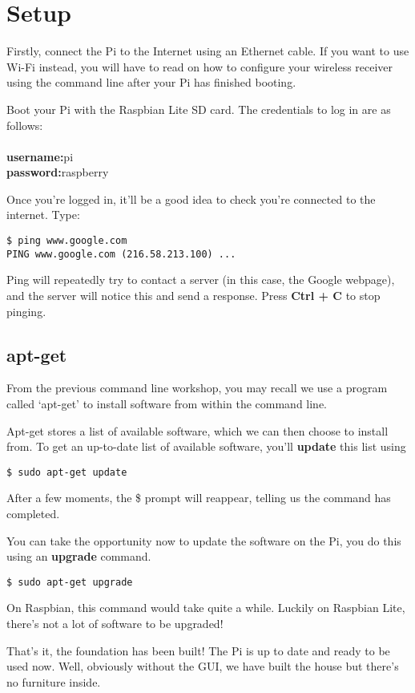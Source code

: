 \section{Setup}

	Firstly, connect the Pi to the Internet using an Ethernet cable. If you want to use Wi-Fi instead, you will have to read on how to configure your wireless receiver using the command line after your Pi has finished booting.
	
	Boot your Pi with the Raspbian Lite SD card. The credentials to log in are as follows:
	\\
	\\\textbf{username:}\hspace{2cm}pi
	\\\textbf{password:}\hspace{2cm}raspberry
	
	\vspace{10pt}
	Once you're logged in, it'll be a good idea to check you're connected to the internet. Type:

\begin{lstlisting}
$ ping www.google.com
PING www.google.com (216.58.213.100) ...
\end{lstlisting}

	Ping will repeatedly try to contact a server (in this case, the Google webpage), and the server will notice this and send a response. Press \textbf{Ctrl + C} to stop pinging.
	
		\subsection*{apt-get}
		
		From the previous command line workshop, you may recall we use a program called `apt-get' to install software from within the command line.
		
		Apt-get stores a list of available software, which we can then choose to install from. To get an up-to-date list of available software, you'll \textbf{update} this list using
	
\begin{lstlisting}
$ sudo apt-get update
\end{lstlisting}

		After a few moments, the \$ prompt will reappear, telling us the command has completed.
		
		You can take the opportunity now to update the software on the Pi, you do this using an \textbf{upgrade} command.
	
\begin{lstlisting}
$ sudo apt-get upgrade
\end{lstlisting}	

		On Raspbian, this command would take quite a while. Luckily on Raspbian Lite, there's not a lot of software to be upgraded!
		
	That's it, the foundation has been built! The Pi is up to date and ready to be used now. Well, obviously without the GUI, we have built the house but there's no furniture inside. 